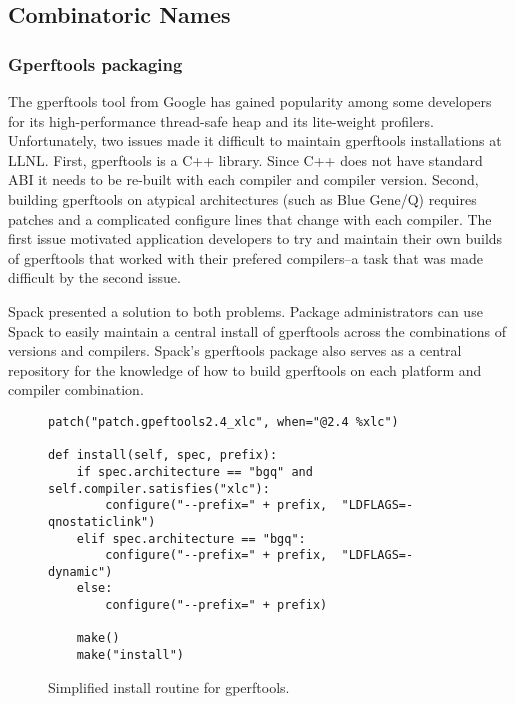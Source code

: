 
\subsection{Combinatoric Names}
\label{sec:usecase-combinatoric}


\subsubsection{Gperftools packaging}

The gperftools tool from Google has gained popularity among some developers for
its high-performance thread-safe heap and its lite-weight profilers.  
Unfortunately, two issues made it difficult to maintain gperftools installations 
at LLNL.  First, gperftools is a C++ library.  Since C++ does not have standard 
ABI it needs to be re-built with each compiler and compiler version.  Second, 
building gperftools on atypical architectures (such as Blue Gene/Q) requires 
patches and a complicated configure lines that change with each compiler.  The 
first issue motivated application developers to try and maintain their own builds 
of gperftools that worked with their prefered compilers--a task that was made 
difficult by the second issue.

Spack presented a solution to both problems.  Package administrators can use Spack to 
easily maintain a central install of gperftools across the combinations of versions 
and compilers.  Spack's gperftools package also serves as a central repository for 
the knowledge of how to build gperftools on each platform and compiler combination.  

\begin{figure}
\begin{verbatim}
patch("patch.gpeftools2.4_xlc", when="@2.4 %xlc")

def install(self, spec, prefix):
    if spec.architecture == "bgq" and self.compiler.satisfies("xlc"):
        configure("--prefix=" + prefix,  "LDFLAGS=-qnostaticlink")
    elif spec.architecture == "bgq":
        configure("--prefix=" + prefix,  "LDFLAGS=-dynamic")
    else:
        configure("--prefix=" + prefix)

    make()
    make("install")
\end{verbatim}
  \caption{
    Simplified install routine for gperftools.
    \label{fig:gperftools}
  }
\end{figure}

